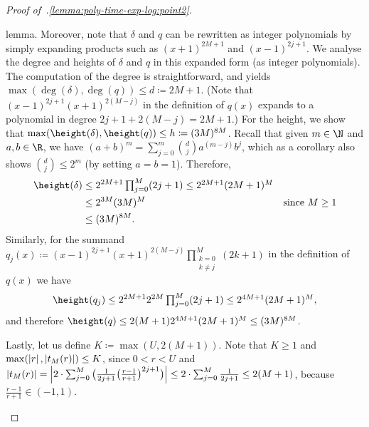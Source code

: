 \begin{proof}[Proof of~.\ref{lemma:poly-time-exp-log:point2}]
\begin{enumerate}
      lemma. Moreover, note that $\delta$ and $q$ can be rewritten as integer
      polynomials by simply expanding products such as $(x+1)^{2M+1}$ and
      $(x-1)^{2j+1}$. We analyse the degree and heights of $\delta$ and $q$ in
      this expanded form (as integer polynomials). The computation of the degree
      is straightforward, and yields $\max(\deg(\delta),\deg(q)) \leq d \coloneqq 2M+1$.
      (Note that $(x-1)^{2j+1} (x+1)^{2(M-j)}$ in the definition of $q(x)$
      expands to a polynomial in degree $2j+1+2(M-j) = 2M+1$.)
      For the height, we show that $\max(\height(\delta),\height(q)) \leq h \coloneqq (3M)^{8M}$. 
      Recall that given $m \in \N$ and $a,b \in \R$, 
      we have $(a+b)^m = \sum_{j=0}^m \binom{d}{j}a^{(m-j)}b^j$,
      which as a corollary also shows $\binom{d}{j} \leq 2^m$
      (by setting $a=b=1$). 
      Therefore, 
      \begin{align*}
        \height(\delta) 
        &\leq 2^{2M+1} \textstyle\prod_{j=0}^M (2j+1)
        \leq 2^{2M+1} (2M+1)^M\\
        &\leq 2^{3M} (3M)^M &\text{since $M \geq 1$}\\
        &\leq (3M)^{8M}.
      \end{align*}
      Similarly, for the summand $q_j(x) \coloneqq (x-1)^{2j+1} (x+1)^{2(M-j)} \prod_{\substack{k=0\\k \neq j}}^M (2k+1)$ in the definition of $q(x)$ we have
      \begin{align*}
        \height(q_j) 
        \leq 2^{2M+1} 2^{2M} \textstyle\prod_{j=0}^M (2j+1) \leq 2^{4M+1} (2M+1)^M,
      \end{align*}
      and therefore $\height(q) \leq 2(M+1)2^{4M+1} (2M+1)^M 
      \leq (3M)^{8M}$.

      Lastly, let us define $K \coloneqq \max(U,2(M+1))$. 
      Note that $K \geq 1$ and $\max(\left|r\right|,\left|t_M(r)\right|) \leq K$, 
      since $0 < r < U$ and 
      $\left|t_M(r)\right| = \left|2 \cdot \sum_{j=0}^M \big(\frac{1}{2j+1} \big(\frac{r-1}{r+1}\big)^{2j+1}\big)\right| \leq 2 \cdot \sum_{j=0}^M \frac{1}{2j+1} \leq 2(M+1)$, 
      because $\frac{r-1}{r+1} \in (-1,1)$.


\end{enumerate}
\end{proof}
